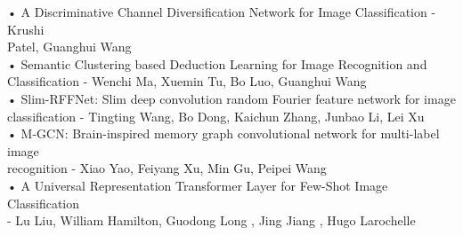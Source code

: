 \documentclass[11pt, a4paper, oneside, pdftex]{research_paper}
\begin{document}
\hspace{10mm} • \quad A Discriminative Channel Diversification Network for Image Classification - Krushi \\ \null \hspace{17mm} Patel, Guanghui Wang \\
\null \hspace{10mm} • \quad Semantic Clustering based Deduction Learning for Image Recognition and \\ \null \hspace{17mm} Classification - Wenchi Ma, Xuemin Tu, Bo Luo, Guanghui Wang \\
\null \hspace{10mm} • \quad Slim-RFFNet: Slim deep convolution random Fourier feature network for image \\ \null \hspace{17mm} classification - Tingting Wang, Bo Dong, Kaichun Zhang, Junbao Li, Lei Xu \\
\null \hspace{10mm} • \quad M-GCN: Brain-inspired memory graph convolutional network for multi-label image \\ \null \hspace{17mm} recognition - Xiao Yao, Feiyang Xu, Min Gu, Peipei Wang \\
\null \hspace{10mm} • \quad A Universal Representation Transformer Layer for Few-Shot Image Classification \\ \null \hspace{17mm} - Lu Liu, William Hamilton, Guodong Long , Jing Jiang , Hugo Larochelle
\end{document}
